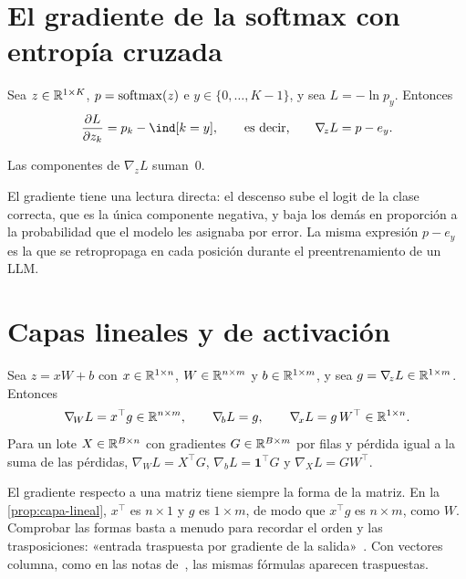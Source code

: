 \section{El gradiente de la softmax con entropía cruzada}

\begin{proposicion}\label{prop:delta-salida}
Sea $z\in\mathbb{R}^{1\times K}$, $p=\operatorname{softmax}(z)$ e $y\in\{0,\dots,K-1\}$, y sea $L=-\ln p_y$. Entonces
\[
\frac{\partial L}{\partial z_k}=p_k-\ind[k=y],\qquad\text{es decir,}\qquad \nabla_{\!z}L=p-e_y.
\]
\end{proposicion}

\begin{corolario}\label{cor:suma-cero}
Las componentes de $\nabla_{\!z}L$ suman~0.
\end{corolario}

El gradiente tiene una lectura directa: el descenso sube el logit de la clase correcta, que es la única componente negativa, y baja los demás en proporción a la probabilidad que el modelo les asignaba por error. La misma expresión $p-e_y$ es la que se retropropaga en cada posición durante el preentrenamiento de un LLM.

\section{Capas lineales y de activación}

\begin{proposicion}\label{prop:capa-lineal}
Sea $z=xW+b$ con $x\in\mathbb{R}^{1\times n}$, $W\in\mathbb{R}^{n\times m}$ y $b\in\mathbb{R}^{1\times m}$, y sea $g=\nabla_{\!z}L\in\mathbb{R}^{1\times m}$. Entonces
\[
\nabla_{\!W}L=x^{\top}g\in\mathbb{R}^{n\times m},\qquad \nabla_{\!b}L=g,\qquad \nabla_{\!x}L=g\,W^{\top}\in\mathbb{R}^{1\times n}.
\]
Para un lote $X\in\mathbb{R}^{B\times n}$ con gradientes $G\in\mathbb{R}^{B\times m}$ por filas y pérdida igual a la suma de las pérdidas, $\nabla_{\!W}L=X^{\top}G$, $\nabla_{\!b}L=\mathbf{1}^{\top}G$ y $\nabla_{\!X}L=GW^{\top}$.
\end{proposicion}

\begin{observacion}
El gradiente respecto a una matriz tiene siempre la forma de la matriz. En la \cref{prop:capa-lineal}, $x^{\top}$ es $n\times 1$ y $g$ es $1\times m$, de modo que $x^{\top}g$ es $n\times m$, como $W$. Comprobar las formas basta a menudo para recordar el orden y las trasposiciones: «entrada traspuesta por gradiente de la salida»~\cite{cs231n}. Con vectores columna, como en las notas de~\cite{cs231n}, las mismas fórmulas aparecen traspuestas.
\end{observacion}

